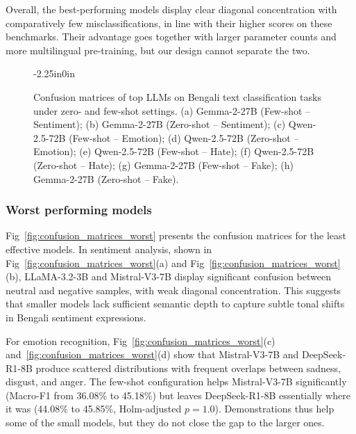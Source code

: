 \documentclass[10pt,letterpaper]{article}
\begin{document}
Overall, the best-performing models display clear diagonal concentration with comparatively few misclassifications, in line with their higher scores on these benchmarks. Their advantage goes together with larger parameter counts and more multilingual pre-training, but our design cannot separate the two.

\begin{figure}[!t]
\begin{adjustwidth}{-2.25in}{0in}
    \centering
    \caption{Confusion matrices of top LLMs on Bengali text classification tasks under zero- and few-shot settings. (a) Gemma-2-27B (Few-shot – Sentiment); (b) Gemma-2-27B (Zero-shot – Sentiment); (c) Qwen-2.5-72B (Few-shot – Emotion); (d) Qwen-2.5-72B (Zero-shot – Emotion); (e) Qwen-2.5-72B (Few-shot – Hate); (f) Qwen-2.5-72B (Zero-shot – Hate); (g) Gemma-2-27B (Few-shot – Fake); (h) Gemma-2-27B (Zero-shot – Fake).}
    \label{fig:confusion_matrices_best}
\end{adjustwidth}
\end{figure}


\subsubsection*{Worst performing models}
\label{sec:worst_performing_models}

Fig~\ref{fig:confusion_matrices_worst} presents the confusion matrices for the least effective models. In sentiment analysis, shown in Fig~\ref{fig:confusion_matrices_worst}(a) and Fig~\ref{fig:confusion_matrices_worst}(b), LLaMA-3.2-3B and Mistral-V3-7B display significant confusion between neutral and negative samples, with weak diagonal concentration. This suggests that smaller models lack sufficient semantic depth to capture subtle tonal shifts in Bengali sentiment expressions.

For emotion recognition, Fig~\ref{fig:confusion_matrices_worst}(c) and~\ref{fig:confusion_matrices_worst}(d) show that Mistral-V3-7B and DeepSeek-R1-8B produce scattered distributions with frequent overlaps between sadness, disgust, and anger. The few-shot configuration helps Mistral-V3-7B significantly (Macro-F1 from 36.08\% to 45.18\%) but leaves DeepSeek-R1-8B essentially where it was (44.08\% to 45.85\%, Holm-adjusted $p = 1.0$). Demonstrations thus help some of the small models, but they do not close the gap to the larger ones.
\end{document}
